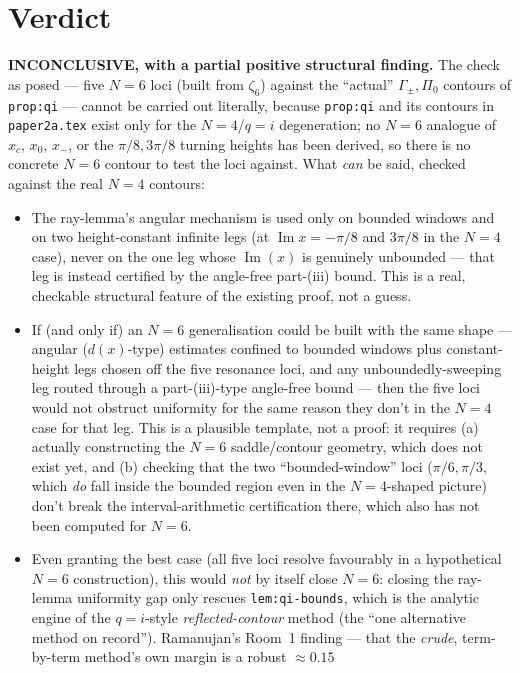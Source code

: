 \documentclass[11pt]{article}
\begin{document}
\section*{Verdict}

\textbf{INCONCLUSIVE, with a partial positive structural finding.} The check as posed --- five
$N=6$ loci (built from $\zeta_6$) against the ``actual'' $\Gamma_\pm,\Pi_0$ contours of
\texttt{prop:qi} --- cannot be carried out literally, because \texttt{prop:qi} and its contours
in \texttt{paper2a.tex} exist only for the $N=4$/$q=i$ degeneration; no $N=6$ analogue of $x_c$,
$x_0$, $x_-$, or the $\pi/8,3\pi/8$ turning heights has been derived, so there is no concrete
$N=6$ contour to test the loci against. What \emph{can} be said, checked against the real $N=4$
contours:
\begin{itemize}
\item The ray-lemma's angular mechanism is used only on bounded windows and on two
height-constant infinite legs (at $\operatorname{Im}x=-\pi/8$ and $3\pi/8$ in the $N=4$ case),
never on the one leg whose $\operatorname{Im}(x)$ is genuinely unbounded --- that leg is instead
certified by the angle-free part-(iii) bound. This is a real, checkable structural feature of
the existing proof, not a guess.
\item If (and only if) an $N=6$ generalisation could be built with the same shape --- angular
($d(x)$-type) estimates confined to bounded windows plus constant-height legs chosen off the
five resonance loci, and any unboundedly-sweeping leg routed through a part-(iii)-type
angle-free bound --- then the five loci would not obstruct uniformity for the same reason they
don't in the $N=4$ case for that leg. This is a plausible template, not a proof: it requires (a)
actually constructing the $N=6$ saddle/contour geometry, which does not exist yet, and (b)
checking that the two ``bounded-window'' loci ($\pi/6,\pi/3$, which \emph{do} fall inside the
bounded region even in the $N=4$-shaped picture) don't break the interval-arithmetic
certification there, which also has not been computed for $N=6$.
\item Even granting the best case (all five loci resolve favourably in a hypothetical $N=6$
construction), this would \emph{not} by itself close $N=6$: closing the ray-lemma uniformity gap
only rescues \texttt{lem:qi-bounds}, which is the analytic engine of the $q=i$-style
\emph{reflected-contour} method (the ``one alternative method on record''). Ramanujan's Room~1
finding --- that the \emph{crude}, term-by-term method's own margin is a robust $\approx0.15$

\end{itemize}
\end{document}
